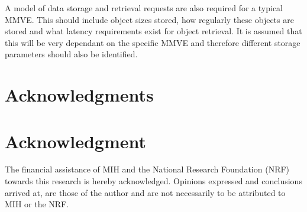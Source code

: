 \documentclass[10pt,a4paper,conference]{IEEEtran}
\begin{document}
A model of data storage and retrieval requests are also required for a typical MMVE. This should include object sizes stored, how regularly these
objects are stored and what latency requirements exist for object retrieval. It is assumed that this will be very dependant on the specific MMVE and
therefore different storage parameters should also be identified.


\ifCLASSOPTIONcompsoc
  \section*{Acknowledgments}
\else
  \section*{Acknowledgment}
\fi

The financial assistance of MIH and the National Research Foundation (NRF) towards this research is hereby acknowledged. Opinions expressed and
conclusions arrived at, are those of the author and are not necessarily to be attributed to MIH or the NRF.




\end{document}
